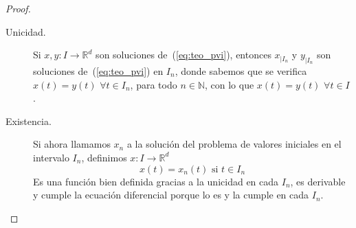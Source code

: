 \begin{teo}
\begin{proof}
\begin{itemize}
                \begin{description}
                    \item [Unicidad.] Si $x,y:I\rightarrow\mathbb{R}^d$ son soluciones de~(\ref{eq:teo_pvi}), entonces $x_{|I_n}$ y $y_{|I_n}$ son soluciones de~(\ref{eq:teo_pvi}) en $I_n$, donde sabemos que se verifica $x(t) = y(t)$ $\forall t\in I_n$, para todo $n\in \mathbb{N}$, con lo que $x(t) = y(t)$ $\forall t\in I$.
                    \item [Existencia.] Si ahora llamamos $x_n$ a la solución del problema de valores iniciales en el intervalo $I_n$, definimos $x:I\rightarrow\mathbb{R}^d$ 
                        \begin{equation*}
                            x(t) = x_n(t) \text{\ si\ } t\in I_n
                        \end{equation*}
                        Es una función bien definida gracias a la unicidad en cada $I_n$, es derivable y cumple la ecuación diferencial porque lo es y la cumple en cada $I_n$.
                \end{description}
        \end{itemize}
    \end{proof}
\end{teo}

